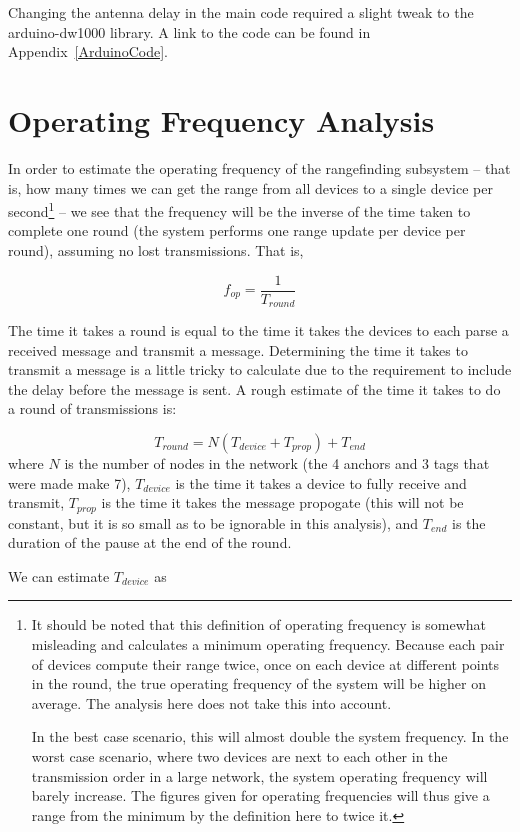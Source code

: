 Changing the antenna delay in the main code required a slight tweak to the arduino-dw1000 library. A link to the code can be found in Appendix~\ref{ArduinoCode}.

\section{Operating Frequency Analysis}
\label{OperatingFrequencyAnalysis}
In order to estimate the operating frequency of the rangefinding subsystem -- that is, how many times we can get the range from all devices to a single device per second\footnote{It should be noted that this definition of operating frequency is somewhat misleading and calculates a minimum operating frequency. Because each pair of devices compute their range twice, once on each device at different points in the round, the true operating frequency of the system will be higher on average. The analysis here does not take this into account. 

In the best case scenario, this will almost double the system frequency. In the worst case scenario, where two devices are next to each other in the transmission order in a large network, the system operating frequency will barely increase. The figures given for operating frequencies will thus give a range from the minimum by the definition here to twice it.} -- we see that the frequency will be the inverse of the time taken to complete one round (the system performs one range update per device per round), assuming no lost transmissions. That is,

\[
 	f_{op} = \frac{1}{T_{round}}
\]

The time it takes a round is equal to the time it takes the devices to each parse a received message and transmit a message. Determining the time it takes to transmit a message is a little tricky to calculate due to the requirement to include the delay before the message is sent. A rough estimate of the time it takes to do a round of transmissions is:

\[
	T_{round} =  N(T_{device} + T_{prop}) + T_{end}
\]
where $N$ is the number of nodes in the network (the 4 anchors and 3 tags that were made make 7), $T_{device}$ is the time it takes a device to fully receive and transmit, $T_{prop}$ is the time it takes the message propogate (this will not be constant, but it is so small as to be ignorable in this analysis), and $T_{end}$ is the duration of the pause at the end of the round. 

We can estimate $T_{device}$ as

